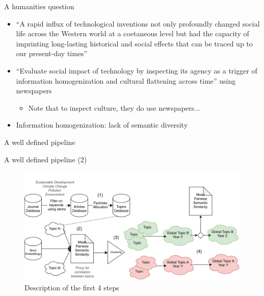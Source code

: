 \documentclass[aspectratio=169]{beamer}
\begin{document}
\begin{frame}{A humanities question}
    \begin{itemize}
        \item ``A rapid influx of technological inventions not only profoundly changed social life across the Western world at a coetaneous level but had the capacity of imprinting long-lasting historical and social effects that can be traced up to our present-day times''
        \item ``Evaluate social impact of technology by inspecting its agency as a trigger of information homogenization and cultural flattening across time'' using newspapers
        \begin{itemize}
            \item Note that to inspect culture, they do use newspapers...
        \end{itemize}
        \item Information homogenization: lack of semantic diversity
    \end{itemize}
\end{frame}

\begin{frame}{A well defined pipeline}

    \begin{table}
        \resizebox{\linewidth}{!}{%
        \begin{tabular}{rrrrrrrr}
            \toprule
            \textbf{The Times} & \textbf{The NYT} & \textbf{Chicago} & \textbf{Irish Times} & \textbf{Le Figaro} & \textbf{El Pais} & \textbf{La Stampa} & \textbf{NZZ} \\ \midrule
            48985              & 26181            & 23123            & 43341                & 32545              & 48819            & 37616              & 23990        \\ \bottomrule
        \end{tabular}}
    \end{table}
\end{frame}

\begin{frame}{A well defined pipeline (2)}

    \begin{figure}
        \centering
        \includegraphics[width=.8\linewidth]{intro-to-ch/images/West.png}
        \caption{Description of the first 4 steps}
    \end{figure}

\end{frame}
\end{document}
